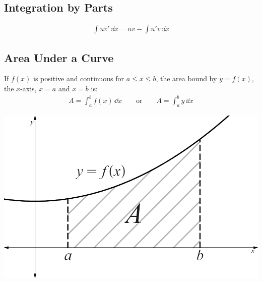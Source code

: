 \documentclass[10pt, a4paper, titlepage]{article}
\begin{document}
\begin{multicols*}{3}
	\dotfill
	\subsection{Integration by Parts}
	\begin{align}
		\int uv'\,\dd{x} = uv-\int u'v\,\dd{x}
	\end{align}

	\dotfill
	\subsection{Area Under a Curve}
	If $f(x)$ is positive and continuous for $a\leq x\leq b$, the area bound by $y=f(x)$, the $x$-axis, $x=a$ and $x=b$ is:
	\begin{align}
		A=\int_{a}^{b}f(x)\,\dd{x}\qquad \text{or}\qquad A=\int_{a}^{b}y\,\dd{x}
	\end{align}
	\begin{center}
		\includegraphics[width=0.9\linewidth]{area_under_a_curve.png}\\
	\end{center}

	\dotfill

\end{multicols*}
\end{document}
